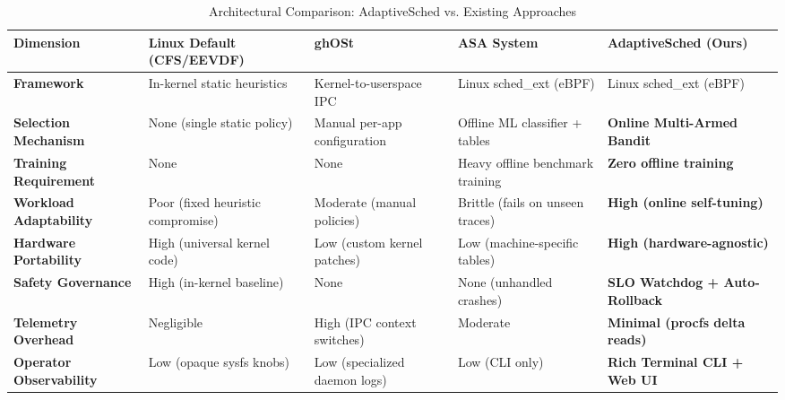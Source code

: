 \documentclass[journal]{IEEEtran}
\begin{document}
\begin{table}[t]
\centering
\caption{Architectural Comparison: AdaptiveSched vs. Existing Approaches}
\label{tab:comparison}
\begin{tabular}{p{3.2cm}p{3.2cm}p{3.2cm}p{3.2cm}p{3.2cm}}
\toprule
\textbf{Dimension} & \textbf{Linux Default (CFS/EEVDF)} & \textbf{ghOSt \cite{humphries2021ghost}} & \textbf{ASA System \cite{asa2025}} & \textbf{AdaptiveSched (Ours)} \\
\midrule
\textbf{Framework} & In-kernel static heuristics & Kernel-to-userspace IPC & Linux sched\_ext (eBPF) & Linux sched\_ext (eBPF) \\
\textbf{Selection Mechanism} & None (single static policy) & Manual per-app configuration & Offline ML classifier + tables & \textbf{Online Multi-Armed Bandit} \\
\textbf{Training Requirement} & None & None & Heavy offline benchmark training & \textbf{Zero offline training} \\
\textbf{Workload Adaptability} & Poor (fixed heuristic compromise) & Moderate (manual policies) & Brittle (fails on unseen traces) & \textbf{High (online self-tuning)} \\
\textbf{Hardware Portability} & High (universal kernel code) & Low (custom kernel patches) & Low (machine-specific tables) & \textbf{High (hardware-agnostic)} \\
\textbf{Safety Governance} & High (in-kernel baseline) & None & None (unhandled crashes) & \textbf{SLO Watchdog + Auto-Rollback} \\
\textbf{Telemetry Overhead} & Negligible & High (IPC context switches) & Moderate & \textbf{Minimal (procfs delta reads)} \\
\textbf{Operator Observability} & Low (opaque sysfs knobs) & Low (specialized daemon logs) & Low (CLI only) & \textbf{Rich Terminal CLI + Web UI} \\
\bottomrule
\end{tabular}
\end{table}
\end{document}
